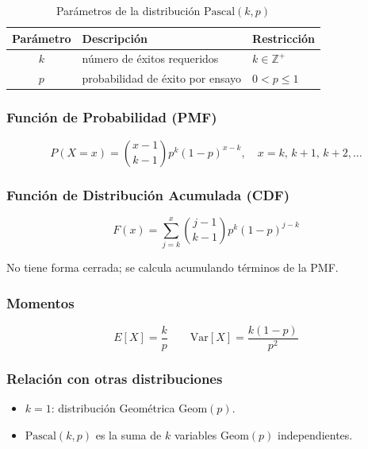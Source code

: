 \begin{table}[h!]
\centering
\begin{tabular}{|c|l|l|}
\hline
\textbf{Parámetro} & \textbf{Descripción} & \textbf{Restricción} \\
\hline
$k$ & número de éxitos requeridos & $k \in \mathbb{Z}^+$ \\
$p$ & probabilidad de éxito por ensayo & $0 < p \leq 1$ \\
\hline
\end{tabular}
\caption{Parámetros de la distribución $\text{Pascal}(k, p)$}
\end{table}

\subsubsection{Función de Probabilidad (PMF)}

\begin{equation}
P(X = x) = \binom{x-1}{k-1} p^k (1-p)^{x-k}, \quad x = k,\, k+1,\, k+2, \ldots
\end{equation}

\subsubsection{Función de Distribución Acumulada (CDF)}

\begin{equation}
F(x) = \sum_{j=k}^{x} \binom{j-1}{k-1} p^k (1-p)^{j-k}
\end{equation}

No tiene forma cerrada; se calcula acumulando términos de la PMF.

\subsubsection{Momentos}

\begin{equation}
E[X] = \frac{k}{p} \qquad \text{Var}[X] = \frac{k(1-p)}{p^2}
\end{equation}

\subsubsection{Relación con otras distribuciones}

\begin{itemize}
    \item $k = 1$: distribución Geométrica $\text{Geom}(p)$.
    \item $\text{Pascal}(k, p)$ es la suma de $k$ variables $\text{Geom}(p)$ independientes.
\end{itemize}


